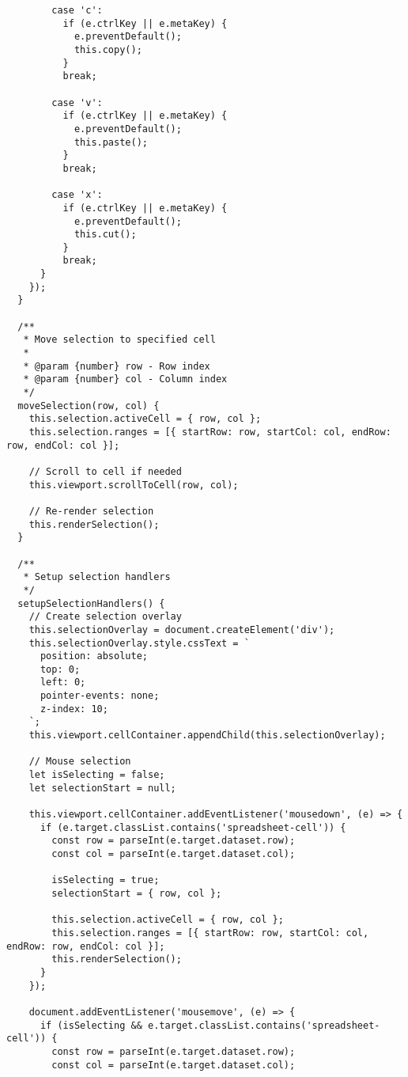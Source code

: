 \documentclass[11pt]{article}
\begin{document}
\begin{verbatim}
        case 'c':
          if (e.ctrlKey || e.metaKey) {
            e.preventDefault();
            this.copy();
          }
          break;
          
        case 'v':
          if (e.ctrlKey || e.metaKey) {
            e.preventDefault();
            this.paste();
          }
          break;
          
        case 'x':
          if (e.ctrlKey || e.metaKey) {
            e.preventDefault();
            this.cut();
          }
          break;
      }
    });
  }
  
  /**
   * Move selection to specified cell
   * 
   * @param {number} row - Row index
   * @param {number} col - Column index
   */
  moveSelection(row, col) {
    this.selection.activeCell = { row, col };
    this.selection.ranges = [{ startRow: row, startCol: col, endRow: row, endCol: col }];
    
    // Scroll to cell if needed
    this.viewport.scrollToCell(row, col);
    
    // Re-render selection
    this.renderSelection();
  }
  
  /**
   * Setup selection handlers
   */
  setupSelectionHandlers() {
    // Create selection overlay
    this.selectionOverlay = document.createElement('div');
    this.selectionOverlay.style.cssText = `
      position: absolute;
      top: 0;
      left: 0;
      pointer-events: none;
      z-index: 10;
    `;
    this.viewport.cellContainer.appendChild(this.selectionOverlay);
    
    // Mouse selection
    let isSelecting = false;
    let selectionStart = null;
    
    this.viewport.cellContainer.addEventListener('mousedown', (e) => {
      if (e.target.classList.contains('spreadsheet-cell')) {
        const row = parseInt(e.target.dataset.row);
        const col = parseInt(e.target.dataset.col);
        
        isSelecting = true;
        selectionStart = { row, col };
        
        this.selection.activeCell = { row, col };
        this.selection.ranges = [{ startRow: row, startCol: col, endRow: row, endCol: col }];
        this.renderSelection();
      }
    });
    
    document.addEventListener('mousemove', (e) => {
      if (isSelecting && e.target.classList.contains('spreadsheet-cell')) {
        const row = parseInt(e.target.dataset.row);
        const col = parseInt(e.target.dataset.col);
        

\end{verbatim}
\end{document}
